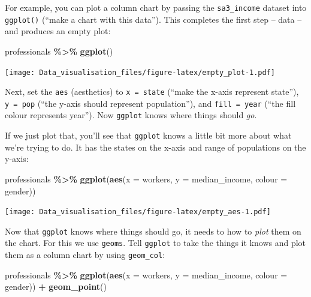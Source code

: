 \documentclass[
]{book}
\newenvironment{Shaded}{\begin{snugshade}}{\end{snugshade}}
\newcommand{\DataTypeTok}[1]{\textcolor[rgb]{0.13,0.29,0.53}{#1}}
\newcommand{\KeywordTok}[1]{\textcolor[rgb]{0.13,0.29,0.53}{\textbf{#1}}}
\newcommand{\NormalTok}[1]{#1}
\newcommand{\OperatorTok}[1]{\textcolor[rgb]{0.81,0.36,0.00}{\textbf{#1}}}
\newcommand{\StringTok}[1]{\textcolor[rgb]{0.31,0.60,0.02}{#1}}
\begin{document}
For example, you can plot a column chart by passing the \texttt{sa3\_income} dataset into \texttt{ggplot()} (``make a chart with this data''). This completes the first step -- data -- and produces an empty plot:

\begin{Shaded}
\begin{Highlighting}[]
\NormalTok{professionals }\OperatorTok{\%\textgreater{}\%}\StringTok{ }
\StringTok{        }\KeywordTok{ggplot}\NormalTok{()}
\end{Highlighting}
\end{Shaded}

\texttt{[image: Data\_visualisation\_files/figure-latex/empty\_plot-1.pdf]}

Next, set the \texttt{aes} (aesthetics) to \texttt{x\ =\ state} (``make the x-axis represent state''), \texttt{y\ =\ pop} (``the y-axis should represent population''), and \texttt{fill\ =\ year} (``the fill colour represents year''). Now \texttt{ggplot} knows where things should \emph{go}.

If we just plot that, you'll see that \texttt{ggplot} knows a little bit more about what we're trying to do. It has the states on the x-axis and range of populations on the y-axis:

\begin{Shaded}
\begin{Highlighting}[]
\NormalTok{professionals }\OperatorTok{\%\textgreater{}\%}\StringTok{ }
\StringTok{        }\KeywordTok{ggplot}\NormalTok{(}\KeywordTok{aes}\NormalTok{(}\DataTypeTok{x =}\NormalTok{ workers,}
                   \DataTypeTok{y =}\NormalTok{ median\_income,}
                   \DataTypeTok{colour =}\NormalTok{ gender))}
\end{Highlighting}
\end{Shaded}

\texttt{[image: Data\_visualisation\_files/figure-latex/empty\_aes-1.pdf]}

Now that \texttt{ggplot} knows where things should go, it needs to how to \emph{plot} them on the chart. For this we use \texttt{geoms}. Tell \texttt{ggplot} to take the things it knows and plot them as a column chart by using \texttt{geom\_col}:

\begin{Shaded}
\begin{Highlighting}[]
\NormalTok{professionals }\OperatorTok{\%\textgreater{}\%}
\StringTok{        }\KeywordTok{ggplot}\NormalTok{(}\KeywordTok{aes}\NormalTok{(}\DataTypeTok{x =}\NormalTok{ workers,}
                   \DataTypeTok{y =}\NormalTok{ median\_income,}
                   \DataTypeTok{colour =}\NormalTok{ gender)) }\OperatorTok{+}\StringTok{ }
\StringTok{        }\KeywordTok{geom\_point}\NormalTok{()}
\end{Highlighting}
\end{Shaded}
\end{document}
